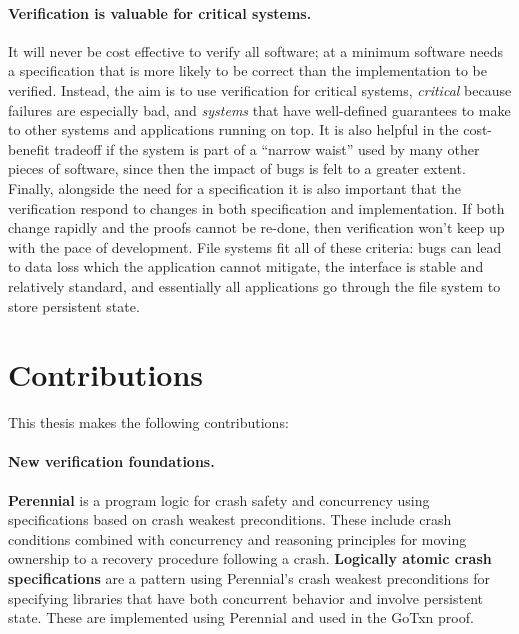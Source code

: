 \paragraph{Verification is valuable for critical systems.} It will never be cost
effective to verify all software; at a minimum software needs a specification
that is more likely to be correct than the implementation to be verified.
Instead, the aim is to use verification for critical systems, \emph{critical}
because failures are especially bad, and \emph{systems} that have well-defined
guarantees to make to other systems and applications running on top. It is also
helpful in the cost-benefit tradeoff if the system is part of a ``narrow waist''
used by many other pieces of software, since then the impact of bugs is felt to
a greater extent. Finally, alongside the need for a specification it is also
important that the verification respond to changes in both specification and
implementation. If both change rapidly and the proofs cannot be re-done, then
verification won't keep up with the pace of development. File systems fit all of
these criteria: bugs can lead to data loss which the application cannot
mitigate, the interface is stable and relatively standard, and essentially all
applications go through the file system to store persistent state.

\resume

\section{Contributions}
\label{sec:intro:contributions}

This thesis makes the following contributions:

\paragraph{New verification foundations.}
\textbf{Perennial} is a program logic for crash safety
and concurrency using specifications based on crash weakest
preconditions. These include crash conditions combined with concurrency
and reasoning principles for moving ownership to a recovery procedure
following a crash. \textbf{Logically atomic crash specifications} are a
pattern using Perennial's crash weakest preconditions for specifying
libraries that have both concurrent behavior and involve persistent
state. These are implemented using Perennial and used in the GoTxn
proof.

